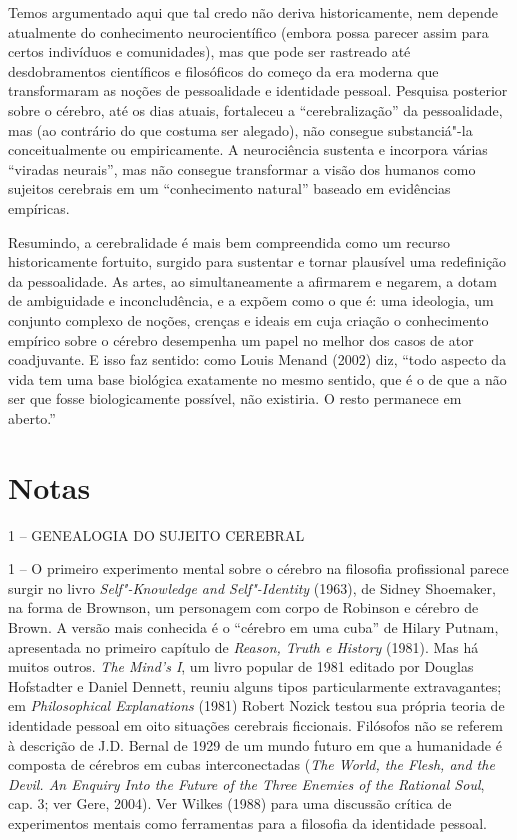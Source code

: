 Temos argumentado aqui que tal credo não deriva historicamente, nem
depende atualmente do conhecimento neurocientífico (embora possa parecer
assim para certos indivíduos e comunidades), mas que pode ser rastreado
até desdobramentos científicos e filosóficos do começo da era moderna
que transformaram as noções de pessoalidade e identidade pessoal.
Pesquisa posterior sobre o cérebro, até os dias atuais, fortaleceu a
``cerebralização'' da pessoalidade, mas (ao contrário do que costuma ser
alegado), não consegue substanciá"-la conceitualmente ou empiricamente. A
neurociência sustenta e incorpora várias ``viradas neurais'', mas não
consegue transformar a visão dos humanos como sujeitos cerebrais em um
``conhecimento natural'' baseado em evidências empíricas.

Resumindo, a cerebralidade é mais bem compreendida como um recurso
historicamente fortuito, surgido para sustentar e tornar plausível uma
redefinição da pessoalidade. As artes, ao simultaneamente a afirmarem e
negarem, a dotam de ambiguidade e inconcludência, e a expõem como o que
é: uma ideologia, um conjunto complexo de noções, crenças e ideais em
cuja criação o conhecimento empírico sobre o cérebro desempenha um papel
no melhor dos casos de ator coadjuvante. E isso faz sentido: como Louis
Menand (2002) diz, ``todo aspecto da vida tem uma base biológica
exatamente no mesmo sentido, que é o de que a não ser que fosse
biologicamente possível, não existiria. O resto permanece em aberto.''

\chapter{Notas}

1 -- GENEALOGIA DO SUJEITO CEREBRAL

1 -- O primeiro experimento mental sobre o cérebro na filosofia
profissional parece surgir no livro \emph{Self"-Knowledge and
Self"-Identity} (1963), de Sidney Shoemaker, na forma de Brownson, um
personagem com corpo de Robinson e cérebro de Brown. A versão mais
conhecida é o ``cérebro em uma cuba'' de Hilary Putnam, apresentada no
primeiro capítulo de \emph{Reason, Truth e History} (1981). Mas há
muitos outros. \emph{The Mind's I}, um livro popular de 1981 editado por
Douglas Hofstadter e Daniel Dennett, reuniu alguns tipos particularmente
extravagantes; em \emph{Philosophical Explanations} (1981) Robert Nozick
testou sua própria teoria de identidade pessoal em oito situações
cerebrais ficcionais. Filósofos não se referem à descrição de J.D.
Bernal de 1929 de um mundo futuro em que a humanidade é composta de
cérebros em cubas interconectadas (\emph{The World, the Flesh, and the
Devil. An Enquiry Into the Future of the Three Enemies of the Rational
Soul}, cap. 3; ver Gere, 2004). Ver Wilkes (1988) para uma discussão
crítica de experimentos mentais como ferramentas para a filosofia da
identidade pessoal.

